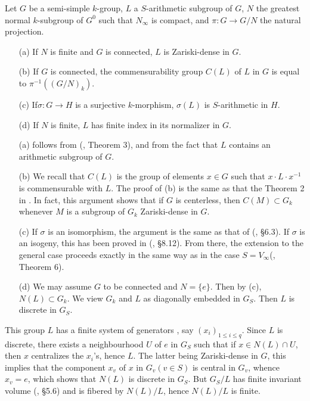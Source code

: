 \setcounter{theorem}{2}
\begin{proposition}\label{art04-prop3.3}
Let $G$ be a semi-simple $k$-group, $L$ a $S$-arithmetic subgroup of $G$, $N$ the greatest normal $k$-subgroup of $G^{0}$ such that $N_{\infty}$ is compact, and $\pi:G\to G/N$ the natural projection.
\begin{itemize}
\item[{\rm(a)}] If $N$ is finite and $G$ is connected, $L$ is Zariski-dense in $G$.
\item[{\rm(b)}] If $G$ is connected, the commensurability group $C(L)$ of $L$ in $G$ is equal to $\pi^{-1}((G/N)_{k})$.
\item[{\rm(c)}] If\pageoriginale $\sigma:G\to H$ is a surjective $k$-morphism, $\sigma(L)$ is $S$-arithmetic in $H$.

\item[{\rm(d)}] If $N$ is finite, $L$ has finite index in its normalizer in $G$.
\end{itemize}
\end{proposition}

\begin{itemize}
\item[(a)] follows from (\cite{art04-key6}, Theorem 3), and from the fact that $L$ contains an arithmetic subgroup of $G$.

\item[(b)] We recall that $C(L)$ is the group of elements $x\in G$ such that $x\cdot L\cdot x^{-1}$ is commensurable with $L$. The proof of (b) is the same as that the Theorem 2 in \cite{art04-key6}. In fact, this argument shows that if $G$ is centerless, then $C(M)\subset G_{k}$ whenever $M$ is a subgroup of $G_{k}$ Zariski-dense in $G$.

\item[(c)] If $\sigma$ is an isomorphism, the argument is the same as that of (\cite{art04-key7}, \S6.3). If $\sigma$ is an isogeny, this has been proved in (\cite{art04-key5}, \S8.12). From there, the extension to the general case proceeds exactly in the same way as in the case $S=V_{\infty}$(\cite{art04-key6}, Theorem 6).

\item[(d)] We may assume $G$ to be connected and $N=\{e\}$. Then by (c), $N(L)\subset G_{k}$. We view $G_{k}$ and $L$ as diagonally embedded in $G_{S}$. Then $L$ is discrete in $G_{S}$.
\end{itemize}

This group $L$ has a finite system of generators \cite{art04-key17}, say $(x_{i})_{1\leq i\leq q}$. Since $L$ is discrete, there exists a neighbourhood $U$ of $e$ in $G_{S}$ such that if $x\in N(L)\cap U$, then $x$ centralizes the $x_{i}$'s, hence $L$. The latter being Zariski-dense in $G$, this implies that the component $x_{v}$ of $x$ in $G_{v}(v\in S)$ is central in $G_{v}$, whence $x_{v}=e$, which shows that $N(L)$ is discrete in $G_{S}$. But $G_{S}/L$ has finite invariant volume (\cite{art04-key5}, \S5.6) and is fibered by $N(L)/L$, hence $N(L)/L$ is finite.

